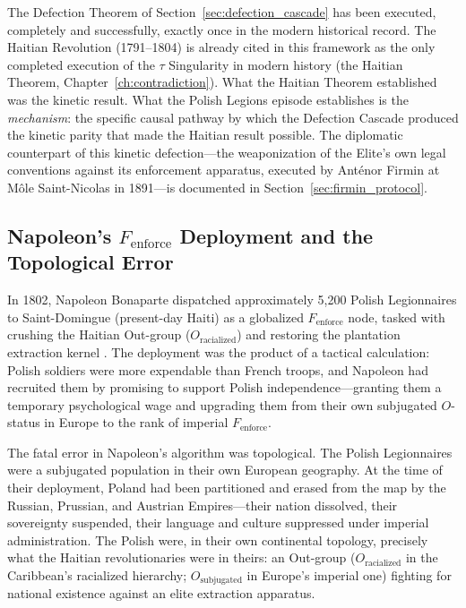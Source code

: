 The Defection Theorem of Section~\ref{sec:defection_cascade} has been executed, completely and successfully, exactly once in the modern historical record. The Haitian Revolution (1791--1804) is already cited in this framework as the only completed execution of the $\tau$ Singularity in modern history (the Haitian Theorem, Chapter~\ref{ch:contradiction}). What the Haitian Theorem established was the kinetic result. What the Polish Legions episode establishes is the \textit{mechanism}: the specific causal pathway by which the Defection Cascade produced the kinetic parity that made the Haitian result possible. The diplomatic counterpart of this kinetic defection---the weaponization of the Elite's own legal conventions against its enforcement apparatus, executed by Ant\'{e}nor Firmin at M\^{o}le Saint-Nicolas in 1891---is documented in Section~\ref{sec:firmin_protocol}.

\subsection{Napoleon's $F_{\text{enforce}}$ Deployment and the Topological Error}

In 1802, Napoleon Bonaparte dispatched approximately 5,200 Polish Legionnaires to Saint-Domingue (present-day Haiti) as a globalized $F_{\text{enforce}}$ node, tasked with crushing the Haitian Out-group ($O_{\text{racialized}}$) and restoring the plantation extraction kernel \cite{pachonski_polish_haiti}. The deployment was the product of a tactical calculation: Polish soldiers were more expendable than French troops, and Napoleon had recruited them by promising to support Polish independence---granting them a temporary psychological wage and upgrading them from their own subjugated $O$-status in Europe to the rank of imperial $F_{\text{enforce}}$.

The fatal error in Napoleon's algorithm was topological. The Polish Legionnaires were a subjugated population in their own European geography. At the time of their deployment, Poland had been partitioned and erased from the map by the Russian, Prussian, and Austrian Empires---their nation dissolved, their sovereignty suspended, their language and culture suppressed under imperial administration. The Polish were, in their own continental topology, precisely what the Haitian revolutionaries were in theirs: an Out-group ($O_{\text{racialized}}$ in the Caribbean's racialized hierarchy; $O_{\text{subjugated}}$ in Europe's imperial one) fighting for national existence against an elite extraction apparatus.

